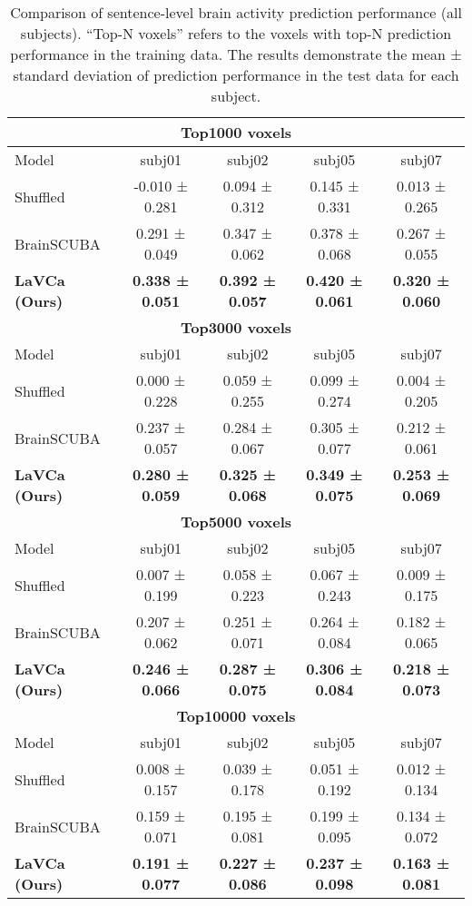 \clearpage
\begin{table*}[t]
\centering
\caption{Comparison of sentence-level brain activity prediction performance (all subjects). ``Top-N voxels'' refers to the voxels with top-N prediction performance in the training data. The results demonstrate the mean ± standard deviation of prediction performance in the test data for each subject.}
\vskip 0.15in
\begin{tabular}{lcccc}
\toprule
\multicolumn{5}{c}{\textbf{Top1000 voxels}} \\
\midrule
Model & subj01 & subj02 & subj05 & subj07 \\
\midrule
Shuffled & -0.010 ± 0.281 & 0.094 ± 0.312 & 0.145 ± 0.331 & 0.013 ± 0.265 \\
BrainSCUBA & 0.291 ± 0.049 & 0.347 ± 0.062 & 0.378 ± 0.068 & 0.267 ± 0.055 \\
\rowcolor{lavcabg} \textbf{LaVCa (Ours)} & \textbf{0.338 ± 0.051} & \textbf{0.392 ± 0.057} & \textbf{0.420 ± 0.061} & \textbf{0.320 ± 0.060} \\
\midrule
\multicolumn{5}{c}{\textbf{Top3000 voxels}} \\
\midrule
Model & subj01 & subj02 & subj05 & subj07 \\
\midrule
Shuffled & 0.000 ± 0.228 & 0.059 ± 0.255 & 0.099 ± 0.274 & 0.004 ± 0.205 \\
BrainSCUBA & 0.237 ± 0.057 & 0.284 ± 0.067 & 0.305 ± 0.077 & 0.212 ± 0.061 \\
\rowcolor{lavcabg} \textbf{LaVCa (Ours)} & \textbf{0.280 ± 0.059} & \textbf{0.325 ± 0.068} & \textbf{0.349 ± 0.075} & \textbf{0.253 ± 0.069} \\
\midrule
\multicolumn{5}{c}{\textbf{Top5000 voxels}} \\
\midrule
Model & subj01 & subj02 & subj05 & subj07 \\
\midrule
Shuffled & 0.007 ± 0.199 & 0.058 ± 0.223 & 0.067 ± 0.243 & 0.009 ± 0.175 \\
BrainSCUBA & 0.207 ± 0.062 & 0.251 ± 0.071 & 0.264 ± 0.084 & 0.182 ± 0.065 \\
\rowcolor{lavcabg} \textbf{LaVCa (Ours)} & \textbf{0.246 ± 0.066} & \textbf{0.287 ± 0.075} & \textbf{0.306 ± 0.084} & \textbf{0.218 ± 0.073} \\
\midrule
\multicolumn{5}{c}{\textbf{Top10000 voxels}} \\
\midrule
Model & subj01 & subj02 & subj05 & subj07 \\
\midrule
Shuffled & 0.008 ± 0.157 & 0.039 ± 0.178 & 0.051 ± 0.192 & 0.012 ± 0.134 \\
BrainSCUBA & 0.159 ± 0.071 & 0.195 ± 0.081 & 0.199 ± 0.095 & 0.134 ± 0.072 \\
\rowcolor{lavcabg} \textbf{LaVCa (Ours)} & \textbf{0.191 ± 0.077} & \textbf{0.227 ± 0.086} & \textbf{0.237 ± 0.098} & \textbf{0.163 ± 0.081} \\
\bottomrule
\end{tabular}
\label{appendix:TopN_sentence_acc_comparison}
\end{table*}

